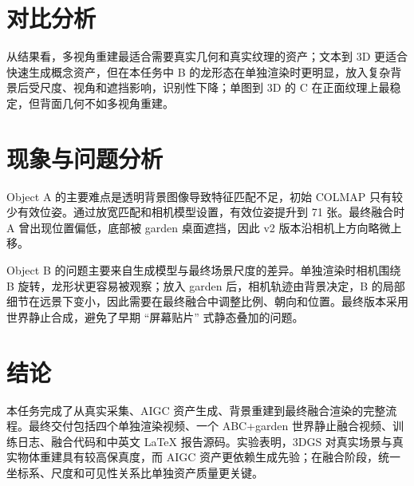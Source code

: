 \documentclass[11pt]{article}
\begin{document}
\section{对比分析}
\begin{table}[H]
\centering
\caption{三种资产生成方式对比}
\end{table}

从结果看，多视角重建最适合需要真实几何和真实纹理的资产；文本到 3D 更适合快速生成概念资产，但在本任务中 B 的龙形态在单独渲染时更明显，放入复杂背景后受尺度、视角和遮挡影响，识别性下降；单图到 3D 的 C 在正面纹理上最稳定，但背面几何不如多视角重建。

\section{现象与问题分析}
Object A 的主要难点是透明背景图像导致特征匹配不足，初始 COLMAP 只有较少有效位姿。通过放宽匹配和相机模型设置，有效位姿提升到 71 张。最终融合时 A 曾出现位置偏低，底部被 garden 桌面遮挡，因此 v2 版本沿相机上方向略微上移。

Object B 的问题主要来自生成模型与最终场景尺度的差异。单独渲染时相机围绕 B 旋转，龙形状更容易被观察；放入 garden 后，相机轨迹由背景决定，B 的局部细节在远景下变小，因此需要在最终融合中调整比例、朝向和位置。最终版本采用世界静止合成，避免了早期 ``屏幕贴片'' 式静态叠加的问题。

\section{结论}
本任务完成了从真实采集、AIGC 资产生成、背景重建到最终融合渲染的完整流程。最终交付包括四个单独渲染视频、一个 ABC+garden 世界静止融合视频、训练日志、融合代码和中英文 LaTeX 报告源码。实验表明，3DGS 对真实场景与真实物体重建具有较高保真度，而 AIGC 资产更依赖生成先验；在融合阶段，统一坐标系、尺度和可见性关系比单独资产质量更关键。
\end{document}
